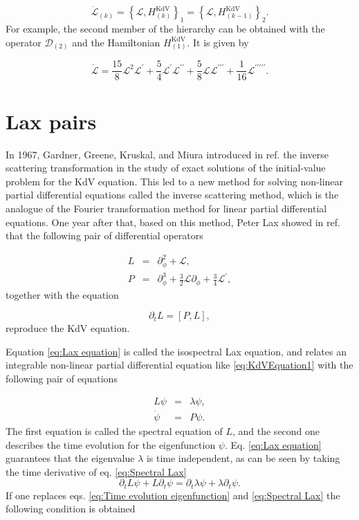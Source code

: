 \documentclass[letterpaper,11pt,oneside]{book}
\begin{document}
\[
\dot{\mathcal{L}}_{\left(k\right)}=\left\{ \mathcal{L},H_{\left(k\right)}^{\text{KdV}}\right\} _{1}=\left\{ \mathcal{L},H_{\left(k-1\right)}^{\text{KdV}}\right\} _{2}.
\]
For example, the second member of the hierarchy can be obtained with
the operator $\mathcal{D}_{\left(2\right)}$ and the Hamiltonian $H_{\left(1\right)}^{\text{KdV}}$. It is given by

\begin{equation}
	\dot{\mathcal{L}}=\frac{15}{8}\mathcal{L}^{2}\mathcal{L}^{\prime}+\frac{5}{4}\mathcal{L}^{\prime}\mathcal{L}^{\prime\prime}+\frac{5}{8}\mathcal{L}\mathcal{L}^{\prime\prime\prime}+\frac{1}{16}\mathcal{L}^{\prime\prime\prime\prime\prime}.\label{eq:KdVEquation2}
\end{equation}


\section{Lax pairs\label{sec:Lax pairs}}

In 1967, Gardner, Greene, Kruskal, and Miura introduced in ref. \cite{Gardner1967} the inverse scattering transformation\emph{ }in the study
of exact solutions of the initial-value problem for the KdV equation. This led to a new method for solving non-linear partial differential equations called the inverse scattering method, which is the analogue of the Fourier transformation method for linear partial differential equations. One year after that, based on this method, Peter Lax showed in ref. \cite{Lax:1968} that the following pair of differential operators

\begin{eqnarray}
	L & = & \partial_{\phi}^{2}+\mathcal{L},\label{eq:Lax L - KdV}\\
	P & = & \partial_{\phi}^{3}+\frac{3}{2}\mathcal{L}\partial_{\phi}+\frac{3}{4}\mathcal{L}^{\prime},\label{eq:Lax P - KdV}
\end{eqnarray}
together with the equation

\begin{equation}
	\partial_{t}L=\left[P,L\right],\label{eq:Lax equation}
\end{equation}
reproduce the KdV equation.

Equation \eqref{eq:Lax equation} is called the isospectral Lax equation,
and relates an integrable non-linear partial differential equation
like \eqref{eq:KdVEquation1} with the following pair of equations

\begin{eqnarray}
	L\psi & = & \lambda\psi,\label{eq:Spectral Lax}\\
	\dot{\psi} & = & P\psi.\label{eq:Time evolution eigenfunction}
\end{eqnarray}
The first equation is called the spectral equation of $L$, and the second
one describes the time evolution for the eigenfunction $\psi$. Eq. \eqref{eq:Lax equation}
guarantees that the eigenvalue $\lambda$ is time independent, as
can be seen by taking the time derivative of  eq. \eqref{eq:Spectral Lax}
\[
\partial_{t}L\psi+L\partial_{t}\psi=\partial_{t}\lambda\psi+\lambda\partial_{t}\psi.
\]
If one replaces eqs. \eqref{eq:Time evolution eigenfunction} and \eqref{eq:Spectral Lax} the following condition is obtained
\end{document}
